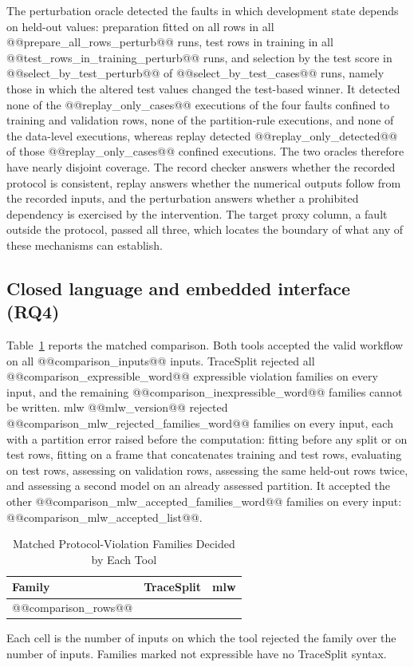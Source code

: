 \documentclass[lettersize,journal]{IEEEtran}
\newcommand{\tool}{TraceSplit}
\begin{document}
The perturbation oracle detected the faults in which development state depends on held-out values: preparation fitted on all rows in all @@prepare_all_rows_perturb@@ runs, test rows in training in all @@test_rows_in_training_perturb@@ runs, and selection by the test score in @@select_by_test_perturb@@ of @@select_by_test_cases@@ runs, namely those in which the altered test values changed the test-based winner. It detected none of the @@replay_only_cases@@ executions of the four faults confined to training and validation rows, none of the partition-rule executions, and none of the data-level executions, whereas replay detected @@replay_only_detected@@ of those @@replay_only_cases@@ confined executions. The two oracles therefore have nearly disjoint coverage. The record checker answers whether the recorded protocol is consistent, replay answers whether the numerical outputs follow from the recorded inputs, and the perturbation answers whether a prohibited dependency is exercised by the intervention. The target proxy column, a fault outside the protocol, passed all three, which locates the boundary of what any of these mechanisms can establish.

\subsection{Closed language and embedded interface (RQ4)}\label{sec:comparison}
Table~\ref{tab:comparison} reports the matched comparison. Both tools accepted the valid workflow on all @@comparison_inputs@@ inputs. \tool{} rejected all @@comparison_expressible_word@@ expressible violation families on every input, and the remaining @@comparison_inexpressible_word@@ families cannot be written. mlw @@mlw_version@@ rejected @@comparison_mlw_rejected_families_word@@ families on every input, each with a partition error raised before the computation: fitting before any split or on test rows, fitting on a frame that concatenates training and test rows, evaluating on test rows, assessing on validation rows, assessing the same held-out rows twice, and assessing a second model on an already assessed partition. It accepted the other @@comparison_mlw_accepted_families_word@@ families on every input: @@comparison_mlw_accepted_list@@.

\begin{table}[t]
\caption{Matched Protocol-Violation Families Decided by Each Tool}
\label{tab:comparison}\centering\footnotesize
\setlength{\tabcolsep}{4pt}
\begin{tabular}{p{}cc}\toprule
Family & \tool{} & mlw\\\midrule
@@comparison_rows@@
\bottomrule
\end{tabular}

\smallskip
\parbox{0.95\columnwidth}{\footnotesize Each cell is the number of inputs on which the tool rejected the family over the number of inputs. Families marked not expressible have no \tool{} syntax.}
\end{table}
\end{document}
